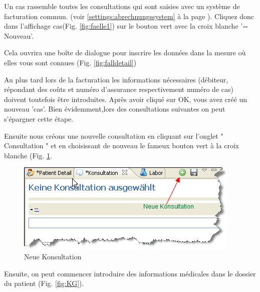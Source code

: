 Un cas rassemble toutes les consultations qui sont saisies avec un système de facturation commun. (voir \ref{settings:abrechnungssystem} à la page \pageref{settings:abrechnungssystem}).
Cliquez donc dans l'affichage \glqq cas\grqq{}(Fig. \ref{fig:faelle1}) sur le bouton vert avec la croix blanche '= Nouveau'.

Cela ouvrira une boîte de dialogue pour inscrire les données dans la mesure où elles vous sont connues (Fig. \ref{fig:falldetail})

Au plus tard lors de la facturation les informations nécessaires (débiteur, répondant des coûts et numéro d'assurance respectivement numéro de cas) doivent toutefois être introduites. Après avoir cliqué sur OK, vous avez créé un nouveau 'cas'. Bien évidemment,lors des consultations suivantes on peut s'épargner cette étape. \\

\bigskip

Ensuite nous créons une nouvelle consultation en cliquant sur l'onglet " Consultation " et en choisissant de nouveau le fameux bouton vert à la croix blanche (Fig. \ref{fig:neuekons}.

\begin{figure}[ht]
	\includegraphics{images/einf5}
	\caption{Neue Konsultation}
	\label{fig:neuekons}
\end{figure}
\pagebreak[2]

Ensuite, on peut commencer introduire des informations médicales dans le dossier du patient (Fig. \ref{fig:KG}).

